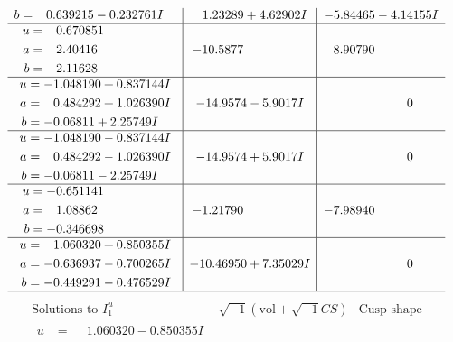 \documentclass[1p]{elsarticle_modified}
\theoremstyle{definition}
\newcommand{\I}{\sqrt{-1}}
\begin{document}
$$\begin{array}{c|c|c}
\begin{aligned}
b &= \phantom{-}0.639215 - 0.232761 I\end{aligned}
 & \phantom{-}1.23289 + 4.62902 I & -5.84465 - 4.14155 I \\ \hline\begin{aligned}
u &= \phantom{-}0.670851\phantom{ +0.000000I} \\
a &= \phantom{-}2.40416\phantom{ +0.000000I} \\
b &= -2.11628\phantom{ +0.000000I}\end{aligned}
 & -10.5877\phantom{ +0.000000I} & \phantom{-}8.90790\phantom{ +0.000000I} \\ \hline\begin{aligned}
u &= -1.048190 + 0.837144 I \\
a &= \phantom{-}0.484292 + 1.026390 I \\
b &= -0.06811 + 2.25749 I\end{aligned}
 & -14.9574 - 5.9017 I & \phantom{-0.000000 } 0 \\ \hline\begin{aligned}
u &= -1.048190 - 0.837144 I \\
a &= \phantom{-}0.484292 - 1.026390 I \\
b &= -0.06811 - 2.25749 I\end{aligned}
 & -14.9574 + 5.9017 I & \phantom{-0.000000 } 0 \\ \hline\begin{aligned}
u &= -0.651141\phantom{ +0.000000I} \\
a &= \phantom{-}1.08862\phantom{ +0.000000I} \\
b &= -0.346698\phantom{ +0.000000I}\end{aligned}
 & -1.21790\phantom{ +0.000000I} & -7.98940\phantom{ +0.000000I} \\ \hline\begin{aligned}
u &= \phantom{-}1.060320 + 0.850355 I \\
a &= -0.636937 - 0.700265 I \\
b &= -0.449291 - 0.476529 I\end{aligned}
 & -10.46950 + 7.35029 I & \phantom{-0.000000 } 0\\
 \hline 
 \end{array}$$\newpage$$\begin{array}{c|c|c}  
\text{Solutions to }I^u_{1}& \I (\text{vol} + \sqrt{-1}CS) & \text{Cusp shape}\\
 \hline 
\begin{aligned}
u &= \phantom{-}1.060320 - 0.850355 I \\

\end{aligned}
\end{array}$$
\end{document}
